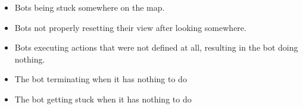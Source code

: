\begin{itemize}
\item Bots being stuck somewhere on the map.
\item Bots not properly resetting their view after looking somewhere.
\item Bots executing actions that were not defined at all, resulting in the bot doing nothing.
\item The bot terminating when it has nothing to do
\item The bot getting stuck when it has nothing to do
\end{itemize}